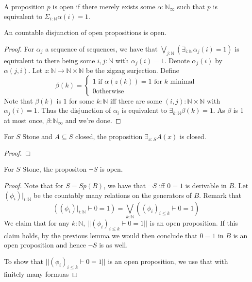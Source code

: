 \begin{definition}
  A proposition $p$ is open if there merely exists some $\alpha:\mathbb N_\infty$ such that 
  $p$ is equivalent to $\Sigma_{i:\mathbb N} \alpha(i) = 1$. 
\end{definition}
\begin{lemma}
  An countable disjunction of open propositions is open. 
\end{lemma}
\begin{proof}
  For $\alpha_j$ a sequence of sequences, 
  we have that $\bigvee_{j:\mathbb N}(\exists_{i:\mathbb N} \alpha_j(i) = 1)$ 
  is equivalent to there being some $i,j:\mathbb N$ with $\alpha_j(i) = 1$. 
  Denote $\alpha_j(i)$ by $\alpha(j,i)$. 
  Let $z:\mathbb N \to \mathbb N \times \mathbb N$ be the zigzag surjection. 
  Define 
  \begin{equation}
    \beta(k) = 
    \begin{cases}
      1 \text{ if } \alpha(z(k)) = 1\text{ for $k$ minimal}\\
      0 \text{otherwise} 
    \end{cases}
  \end{equation}
  Note that $\beta(k)$ is $1$ for some $k:\mathbb N$ iff there are some $(i,j):\mathbb N \times \mathbb N$ 
  with $\alpha_j(i) = 1$. 
  Thus the disjunction of $\alpha_i$ is equivalent to 
  $\exists_{k:\mathbb N} \beta(k) = 1$. 
  As $\beta$ is $1$ at most once, $\beta:\mathbb N_\infty$ and we're done. 
\end{proof}

\begin{lemma}
  For $S$ Stone and $A\subseteq S$ closed, 
  the proposition $\exists_{x:S} A(x)$ is closed. 
\end{lemma}
\begin{proof}
  
\end{proof}




\begin{lemma}
  For $S$ Stone, the propositon $\neg S$ is open. 
\end{lemma}

\begin{proof}
  Note that for $S = Sp(B)$, we have that $\neg S$ iff $0=1$ is derivable in $B$. 
  Let $(\phi_i)|_{i:\mathbb N}$ be the countably many relations on the generators of $B$. 
  Remark that 
  \begin{equation}
    ((\phi_i)|_{i:\mathbb N} \vdash 0 = 1 )= \bigvee_{k:\mathbb N} ((\phi_i)_{i\leq k} \vdash 0 = 1)
  \end{equation}
  We claim that for any $k:\mathbb N$, $||(\phi_i)_{i\leq k} \vdash 0 = 1||$ is an open proposition. 
  If this claim holds, by the previous lemma we would then conclude that $0=1$ in $B$ is an open proposition
  and hence $\neg S$ is as well. 

  To show that $||(\phi_i)_{i\leq k} \vdash 0 = 1||$ is an open proposition, 
  we use that with finitely many formuas


\end{proof}
